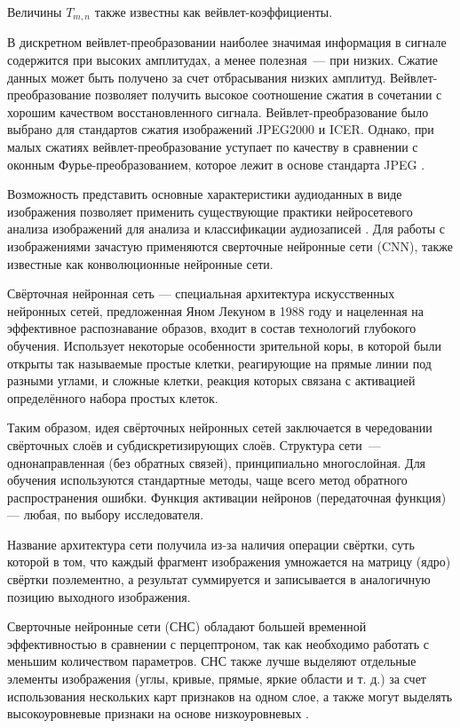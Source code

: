 Величины $T_{{m,n}}$ также известны как вейвлет-коэффициенты.

В дискретном вейвлет-преобразовании наиболее значимая информация в сигнале содержится 
при высоких амплитудах, а менее полезная — при низких.
Сжатие данных может быть получено за счет отбрасывания низких амплитуд.
Вейвлет-преобразование позволяет получить высокое соотношение сжатия в сочетании с хорошим качеством восстановленного сигнала. 
Вейвлет-преобразование было выбрано для стандартов сжатия изображений JPEG2000 и ICER.
Однако, при малых сжатиях вейвлет-преобразование уступает по качеству в сравнении с оконным Фурье-преобразованием, которое лежит в основе стандарта JPEG \cite{wavelet}. 

Возможность представить основные характеристики аудиоданных в виде изображения позволяет применить существующие практики
нейросетевого анализа изображений для анализа и классификации аудиозаписей \cite{cyber_alex}.
Для работы с изображениями зачастую применяются сверточные нейронные сети (CNN), также известные как конволюционные нейронные сети.

Свёрточная нейронная сеть — специальная архитектура искусственных нейронных сетей, предложенная Яном Лекуном в 1988 году и нацеленная на эффективное распознавание образов, входит в состав технологий глубокого обучения. 
Использует некоторые особенности зрительной коры, в которой были открыты так называемые простые клетки, реагирующие на прямые линии под разными углами, и сложные клетки, реакция которых связана с активацией определённого набора простых клеток. 

Таким образом, идея свёрточных нейронных сетей заключается в чередовании свёрточных слоёв и субдискретизирующих слоёв. Структура сети — однонаправленная (без обратных связей), принципиально многослойная. Для обучения используются стандартные методы, чаще всего метод обратного распространения ошибки. Функция активации нейронов (передаточная функция) — любая, по выбору исследователя.

Название архитектура сети получила из-за наличия операции свёртки, суть которой в том, что каждый фрагмент изображения умножается на матрицу (ядро) свёртки поэлементно, а результат суммируется и записывается в аналогичную позицию выходного изображения. 

Сверточные нейронные сети (СНС) обладают большей временной эффективностью в сравнении с перцептроном, так как необходимо
работать с меньшим количеством параметров. СНС также лучше выделяют отдельные элементы изображения (углы,
кривые, прямые, яркие области и т. д.) за счет использования нескольких карт признаков на одном слое, а также могут 
выделять высокоуровневые признаки на основе низкоуровневых \cite{cyberbred}.

